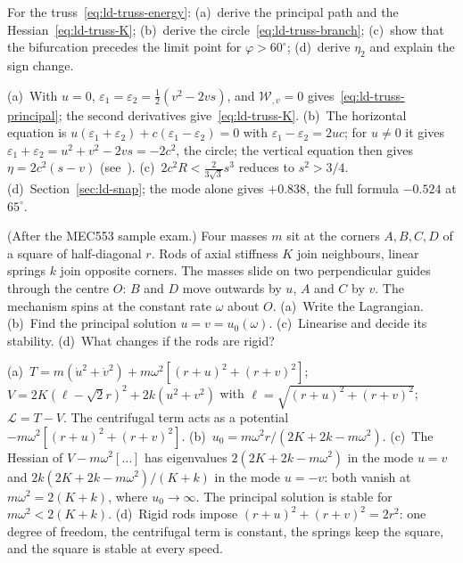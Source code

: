 \label{exo:ld-truss}
%
For the truss~\eqref{eq:ld-truss-energy}: (a)~derive the principal path and the
Hessian~\eqref{eq:ld-truss-K}; (b)~derive the circle~\eqref{eq:ld-truss-branch};
(c)~show that the bifurcation precedes the limit point for $\varphi > 60^\circ$;
(d)~derive $\eta_2$ and explain the sign change.
\begin{solution}
(a)~With $u = 0$, $\varepsilon_1 = \varepsilon_2 = \tfrac12(v^2 - 2vs)$, and
$\mathcal{W}_{,v} = 0$ gives~\eqref{eq:ld-truss-principal}; the second derivatives
give~\eqref{eq:ld-truss-K}. (b)~The horizontal equation is $u(\varepsilon_1 + \varepsilon_2) + c(\varepsilon_1 - \varepsilon_2) = 0$
with $\varepsilon_1 - \varepsilon_2 = 2uc$; for $u \neq 0$ it gives
$\varepsilon_1 + \varepsilon_2 = u^2 + v^2 - 2vs = -2c^2$, the circle; the vertical
equation then gives $\eta = 2c^2(s - v)$ (see~\cite[p.~43]{ld-triantafyllidis2011}).
(c)~$2c^2R < \tfrac{2}{3\sqrt3}s^3$ reduces to $s^2 > 3/4$. (d)~Section~\ref{sec:ld-snap};
the mode alone gives $+0.838$, the full formula $-0.524$ at $65^\circ$.
\end{solution}

\label{exo:ld-rotating}
%
(After the MEC553 sample exam.) Four masses $m$ sit at the corners $A,B,C,D$ of a
square of half-diagonal $r$. Rods of axial stiffness $K$ join neighbours, linear
springs $k$ join opposite corners. The masses slide on two perpendicular guides
through the centre $O$: $B$ and $D$ move outwards by $u$, $A$ and $C$ by $v$. The
mechanism spins at the constant rate $\omega$ about $O$.
(a)~Write the Lagrangian. (b)~Find the principal solution $u = v = u_0(\omega)$.
(c)~Linearise and decide its stability. (d)~What changes if the rods are rigid?
\begin{solution}
(a)~$T = m(\dot u^2 + \dot v^2) + m\omega^2[(r + u)^2 + (r + v)^2]$;
$V = 2K(\ell - \sqrt2 r)^2 + 2k(u^2 + v^2)$ with $\ell = \sqrt{(r+u)^2 + (r+v)^2}$;
$\mathcal{L} = T - V$. The centrifugal term acts as a potential
$-m\omega^2[(r+u)^2 + (r+v)^2]$. (b)~$u_0 = m\omega^2r/(2K + 2k - m\omega^2)$.
(c)~The Hessian of $V - m\omega^2[\dots]$ has eigenvalues $2(2K + 2k - m\omega^2)$ in the
mode $u = v$ and $2k(2K + 2k - m\omega^2)/(K + k)$ in the mode $u = -v$: both vanish at
$m\omega^2 = 2(K + k)$, where $u_0 \to \infty$. The principal solution is stable for
$m\omega^2 < 2(K + k)$. (d)~Rigid rods impose $(r + u)^2 + (r + v)^2 = 2r^2$: one degree
of freedom, the centrifugal term is constant, the springs keep the square, and the
square is stable at every speed.
\end{solution}

